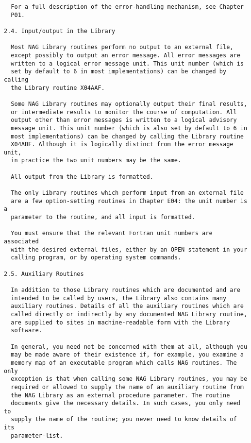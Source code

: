\begin{verbatim}
  For a full description of the error-handling mechanism, see Chapter
  P01.
 
2.4. Input/output in the Library
 
  Most NAG Library routines perform no output to an external file,
  except possibly to output an error message. All error messages are
  written to a logical error message unit. This unit number (which is
  set by default to 6 in most implementations) can be changed by calling
  the Library routine X04AAF.
 
  Some NAG Library routines may optionally output their final results,
  or intermediate results to monitor the course of computation. All
  output other than error messages is written to a logical advisory
  message unit. This unit number (which is also set by default to 6 in
  most implementations) can be changed by calling the Library routine
  X04ABF. Although it is logically distinct from the error message unit,
  in practice the two unit numbers may be the same.
 
  All output from the Library is formatted.
 
  The only Library routines which perform input from an external file
  are a few option-setting routines in Chapter E04: the unit number is a
  parameter to the routine, and all input is formatted.
 
  You must ensure that the relevant Fortran unit numbers are associated
  with the desired external files, either by an OPEN statement in your
  calling program, or by operating system commands.
 
2.5. Auxiliary Routines
 
  In addition to those Library routines which are documented and are
  intended to be called by users, the Library also contains many
  auxiliary routines. Details of all the auxiliary routines which are
  called directly or indirectly by any documented NAG Library routine,
  are supplied to sites in machine-readable form with the Library
  software.
 
  In general, you need not be concerned with them at all, although you
  may be made aware of their existence if, for example, you examine a
  memory map of an executable program which calls NAG routines. The only
  exception is that when calling some NAG Library routines, you may be
  required or allowed to supply the name of an auxiliary routine from
  the NAG Library as an external procedure parameter. The routine
  documents give the necessary details. In such cases, you only need to
  supply the name of the routine; you never need to know details of its
  parameter-list.
 

\end{verbatim}
